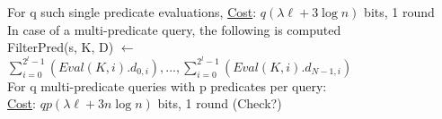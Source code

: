 For q such single predicate evaluations, \underline{Cost}: $q(\lambda \ell + 3 \log n)$ bits, 1 round \\

In case of a multi-predicate query, the following is computed \\

FilterPred(s, K, D) $\leftarrow$ $\sum_{i = 0}^{2^l-1}(Eval(K, i).d_{0, i}), ... , \sum_{i = 0}^{2^l-1}(Eval(K, i).d_{N-1, i})$ \\

For q multi-predicate queries with p predicates per query:\\

\underline{Cost}: $qp(\lambda \ell + 3n \log n)$ bits, 1 round (Check?)

\begin{comment}
\section{Our Explorations}

Consider $m$ single bit attributes of a database, $A_m$, $A_{m-1}$, ..., $A_1$ (writing it this way as it's easier to visualize each record as an m-bit integer). There are $n$ records. \\

Consider the WHERE predicate: "WHERE $A_m == 1$". \\

That means, we need to find the no. of records that lie in the interval $1...0$ (1 followed by m-1 zeroes) to $1...1$ (m ones). We have $n$ DCF keys, each of size roughly $\lambda m \log n$ bits. We have a single interval. This is a Multiple Interval Containment (MIC) gate scenario. \\

Consider the WHERE predicate: "WHERE $A_{m-2} == 1$". \\

That means, we need to find the no. of records in the following intervals:
\begin{enumerate}
    \item $0010..00$ to $0011...1$
    \item $0110..00$ to $0111...1$
    \item $1010..00$ to $1011...1$
    \item $1110..00$ to $1111...1$
\end{enumerate}

We have $n$ DCF keys, each of size roughly $\lambda m \log n$ bits. We have $2^2$ intervals now ($A_m$ and $A_{m-1}$ can take any value so). This is a Multiple Interval Containment (MIC) gate scenario. \\


\end{comment}
